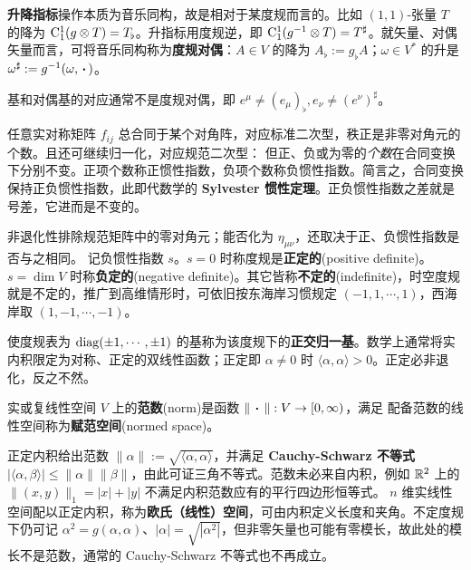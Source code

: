 \begin{definition}
    \textbf{升降指标}操作本质为音乐同构，故是相对于某度规而言的。比如 $(1,1)$-张量 $T$ 的降为
    $\mathrm{C}_1^1(g\otimes T)=T_\flat$。升指标用度规逆，即 $\mathrm{C}_1^1(g^{-1}\otimes T)=T^\sharp$。就矢量、对偶矢量而言，可将音乐同构称为\textbf{度规对偶}：$A\in V$ 的降为 $A_\flat:=g_\flat A$；$\omega\in V^*$ 的升是 $\omega^\sharp:=g^{-1}(\omega,\oo)$。
\end{definition}

\begin{remark}
    基和对偶基的对应通常不是度规对偶，即 $e^\mu\ne (e_\mu)_\flat, e_\nu\ne (e^\nu)^\sharp$。
\end{remark}

任意实对称矩阵 $f_{ij}$ 总合同于某个对角阵，对应标准二次型，秩正是非零对角元的个数。且还可继续归一化，对应规范二次型：
但正、负或为零的\emph{个数}在合同变换下分别不变。正项个数称正惯性指数，负项个数称负惯性指数。简言之，合同变换保持正负惯性指数，此即代数学的 \textbf{Sylvester 惯性定理}。正负惯性指数之差就是号差，它进而是不变的。

非退化性排除规范矩阵中的零对角元；能否化为 $\eta_{\mu\nu}$，还取决于正、负惯性指数是否与之相同。
记负惯性指数 $s$。$s=0$ 时称度规是\textbf{正定的}(positive definite)。$s=\dim V$ 时称\textbf{负定的}(negative definite)。其它皆称\textbf{不定的}(indefinite)，时空度规就是不定的，推广到高维情形时，可依旧按东海岸习惯规定 $(-1,1,\cdots,1)$，西海岸取 $(1,-1,\cdots,-1)$。

使度规表为 $\operatorname{diag}(\pm1,\cdots,\pm1)$ 的基称为该度规下的\textbf{正交归一基}。数学上通常将实内积限定为对称、正定的双线性函数；正定即 $\alpha\ne0$ 时 $\langle\alpha,\alpha\rangle>0$。正定必非退化，反之不然。

\begin{definition}\label{def:normed-space}
    实或复线性空间 $V$ 上的\textbf{范数}(norm)是函数 $\|\oo\|:V\to[0,\infty)$，满足
    配备范数的线性空间称为\textbf{赋范空间}(normed space)。
\end{definition}

正定内积给出范数 $\|\alpha\|:=\sqrt{\langle\alpha,\alpha\rangle}$，并满足 \textbf{Cauchy-Schwarz 不等式} $|\langle\alpha,\beta\rangle|\leqslant\|\alpha\|\|\beta\|$，由此可证三角不等式。范数未必来自内积，例如 $\mathbb{R}^2$ 上的 $\|(x,y)\|_1=|x|+|y|$ 不满足内积范数应有的平行四边形恒等式。
$n$ 维实线性空间配以正定内积，称为\textbf{欧氏（线性）空间}，可由内积定义长度和夹角。不定度规下仍可记 $\alpha^2=g(\alpha,\alpha)$、$|\alpha|=\sqrt{|\alpha^2|}$，但非零矢量也可能有零模长，故此处的模长不是范数，通常的 Cauchy-Schwarz 不等式也不再成立。

